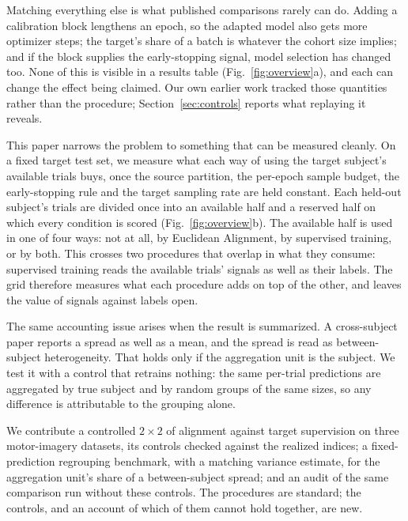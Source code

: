Matching everything else is what published comparisons rarely can do. Adding a calibration block lengthens an epoch, so the adapted model also gets more optimizer steps; the target's share of a batch is whatever the cohort size implies; and if the block supplies the early-stopping signal, model selection has changed too. None of this is visible in a results table (Fig.~\ref{fig:overview}a), and each can change the effect being claimed. Our own earlier work tracked those quantities rather than the procedure; Section~\ref{sec:controls} reports what replaying it reveals.

This paper narrows the problem to something that can be measured cleanly. On a fixed target test set, we measure what each way of using the target subject's available trials buys, once the source partition, the per-epoch sample budget, the early-stopping rule and the target sampling rate are held constant. Each held-out subject's trials are divided once into an available half and a reserved half on which every condition is scored (Fig.~\ref{fig:overview}b). The available half is used in one of four ways: not at all, by Euclidean Alignment, by supervised training, or by both. This crosses two procedures that overlap in what they consume: supervised training reads the available trials' signals as well as their labels. The grid therefore measures what each procedure adds on top of the other, and leaves the value of signals against labels open.

The same accounting issue arises when the result is summarized. A cross-subject paper reports a spread as well as a mean, and the spread is read as between-subject heterogeneity. That holds only if the aggregation unit is the subject. We test it with a control that retrains nothing: the same per-trial predictions are aggregated by true subject and by random groups of the same sizes, so any difference is attributable to the grouping alone.

We contribute a controlled $2\times2$ of alignment against target supervision on three motor-imagery datasets, its controls checked against the realized indices; a fixed-prediction regrouping benchmark, with a matching variance estimate, for the aggregation unit's share of a between-subject spread; and an audit of the same comparison run without these controls. The procedures are standard; the controls, and an account of which of them cannot hold together, are new.

